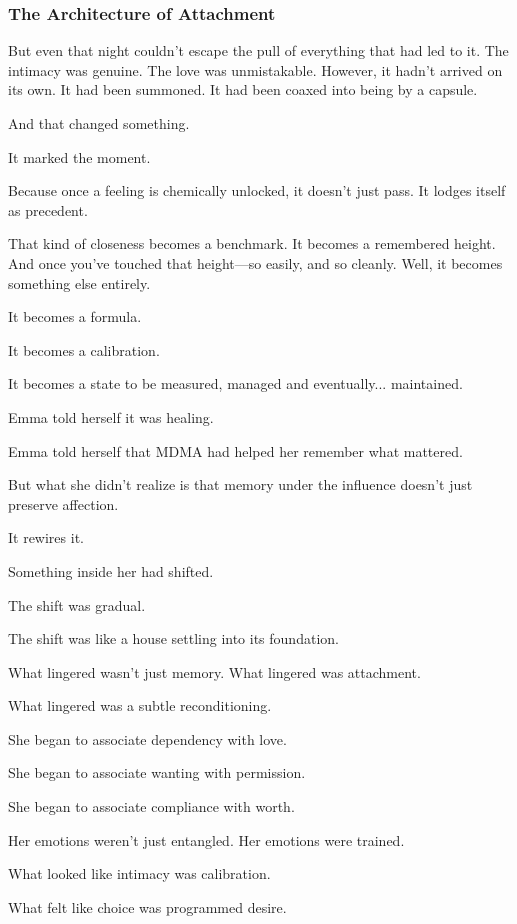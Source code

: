 \subsubsection{The Architecture of Attachment}

But even that night couldn't 
escape the pull of everything that had led to it. The intimacy was genuine. The love was unmistakable. 
However, it hadn’t arrived on its own. It had been summoned. It had been coaxed into being by a capsule.

And that changed something.

It marked the moment.

Because once a feeling is chemically unlocked, it doesn’t just pass.
It lodges itself as precedent.

That kind of closeness becomes a benchmark. It becomes a remembered height.
And once you've touched that height—so easily, and so cleanly. Well, it becomes something else entirely.

It becomes a formula.

It becomes a calibration.

It becomes a state to be measured, managed and eventually... maintained.

Emma told herself it was healing. 

Emma told herself that MDMA had helped her remember what mattered.

But what she didn’t realize is that memory under the influence 
doesn't just preserve affection.

It rewires it.

Something inside her had shifted. 

The shift was gradual. 

The shift was like a house settling into its foundation. 

What lingered wasn’t just memory. 
What lingered was attachment. 

What lingered was a subtle reconditioning. 

She began to associate dependency with love. 

She began to associate wanting with permission.

She began to associate compliance with worth.

Her emotions weren’t just entangled. 
Her emotions were trained.

What looked like intimacy was calibration.

What felt like choice was programmed desire.


